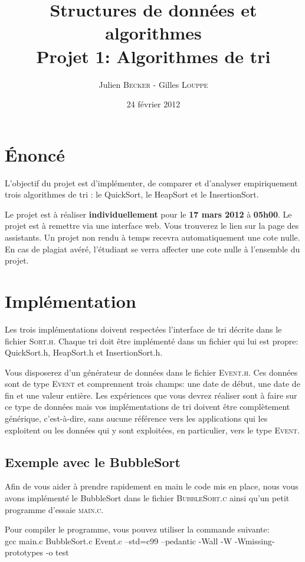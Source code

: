 \documentclass[a4paper,10pt]{article}
\title{
    \textbf{Structures de données et algorithmes}\\
    Projet 1: Algorithmes de tri
}
\author{Julien \textsc{Becker} - Gilles \textsc{Louppe}}
\date{24 février 2012}
\begin{document}
\maketitle

\section*{\'Enoncé}

L'objectif du projet est d'implémenter, de comparer et d'analyser empiriquement trois algorithmes de tri : le QuickSort, le HeapSort et le InsertionSort.

Le projet est à réaliser {\bf individuellement} pour le {\bf 17 mars 2012} à {\bf 05h00}. Le projet est à remettre via une interface web. Vous trouverez le lien sur la page des assistants. Un projet non rendu à temps recevra automatiquement une cote nulle.
En cas de plagiat avéré, l'étudiant se verra affecter une cote nulle à l'ensemble du projet.

\section*{Implémentation}
Les trois implémentations doivent respectées l'interface de tri décrite dans le fichier \textsc{Sort.h}. Chaque tri doit être implémenté dans un fichier qui lui est propre: QuickSort.h, HeapSort.h et InsertionSort.h.

Vous disposerez d'un générateur de données dans le fichier \textsc{Event.h}. Ces données sont de type \textsc{Event} et comprennent trois champs: une date de début, une date de fin et une valeur entière. Les expériences que vous devrez réaliser sont à faire sur ce type de données mais vos implémentations de tri doivent être complètement générique, c'est-à-dire, sans aucune référence vers les applications qui les exploitent ou les données qui y sont exploitées, en particulier, vers le type \textsc{Event}.

\subsection*{Exemple avec le BubbleSort}
Afin de vous aider à prendre rapidement en main le code mis en place, nous vous avons implémenté le BubbleSort dans le fichier \textsc{BubbleSort.c} ainsi qu'un petit programme d'essaie \textsc{main.c}.

Pour compiler le programme, vous pouvez utiliser la commande suivante: \\
gcc main.c BubbleSort.c Event.c --std=c99 --pedantic -Wall -W -Wmissing-prototypes -o test
\end{document}

